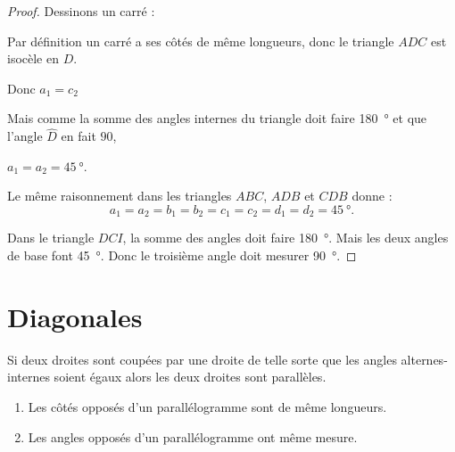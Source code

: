 \begin{proof}
    Dessinons un carré :
    \begin{center}
        
    \end{center}
    Par définition un carré a ses côtés de même longueurs, donc le triangle \( ADC\) est isocèle en \( D\).
    \begin{center}
        Donc \( a_1=c_2\)
    \end{center}
    Mais comme la somme des angles internes du triangle doit faire \SI{180}{\degree} et que l'angle \( \hat D\) en fait \( 90\), 
    \begin{center}
        \( a_1=a_2=\SI{45}{\degree}\).
    \end{center}
    Le même raisonnement dans les triangles \( ABC\), \( ADB\) et \( CDB\) donne :
    \begin{equation}
        a_1=a_2=b_1=b_2=c_1=c_2=d_1=d_2=\SI{45}{\degree}.
    \end{equation}
    
    Dans le triangle \( DCI\), la somme des angles doit faire \SI{180}{\degree}. Mais les deux angles de base font \SI{45}{\degree}. Donc le troisième angle doit mesurer \SI{90}{\degree}.

\end{proof}



\section{Diagonales}

\begin{propriete}
    Si deux droites sont coupées par une droite de telle sorte que les angles alternes-internes soient égaux alors les deux droites sont parallèles.
\end{propriete}

\begin{center}

\end{center}


\begin{propriete}
    \begin{enumerate}
        \item
            Les côtés opposés d'un parallélogramme sont de même longueurs.
        \item
            Les angles opposés d'un parallélogramme ont même mesure.
    \end{enumerate}
\end{propriete}

